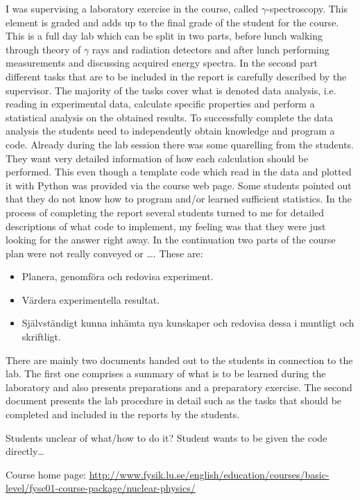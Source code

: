 \documentclass[]{article}
\begin{document}
I was supervising a laboratory exercise in the course, called $\gamma$-spectroscopy.
This element is graded and adds up to the final grade of the student for the course.
This is a full day lab which can be split in two parts, before lunch walking through theory of $\gamma$ rays and radiation detectors and after lunch performing measurements and discussing acquired energy spectra.
In the second part different tasks that are to be included in the report is carefully described by the supervisor.
The majority of the tasks cover what is denoted data analysis, i.e. reading in experimental data, calculate specific properties and perform a statistical analysis on the obtained results.
To successfully complete the data analysis the students need to independently obtain knowledge and program a code.
Already during the lab session there was some quarelling from the students.
They want very detailed information of how each calculation should be performed.
This even though a template code which read in the data and plotted it with Python was provided via the course web page.
Some students pointed out that they do not know how to program and/or learned sufficient statistics.
In the process of completing the report several students turned to me for detailed descriptions of what code to implement, my feeling was that they were just looking for the answer right away.
In the continuation two parts of the course plan were not really conveyed or \dots. These are:
\begin{itemize}
  \item Planera, genomföra och redovisa experiment.
  \item Värdera experimentella resultat.
  \item Självständigt kunna inhämta nya kunskaper och redovisa dessa i muntligt och skriftligt.
\end{itemize}

There are mainly two documents handed out to the students in connection to the lab.
The first one comprises a summary of what is to be learned during the laboratory and also presents preparations and a preparatory exercise.
The second document presents the lab procedure in detail such as the tasks that should be completed and included in the reports by the students.

Students unclear of what/how to do it? Student wants to be given the code directly\dots

Course home page: \url{http://www.fysik.lu.se/english/education/courses/basic-level/fysc01-course-package/nuclear-physics/}
\end{document}
